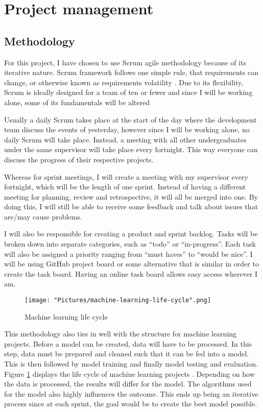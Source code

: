 \documentclass[11pt]{article}
\begin{document}
\section{Project management}
\subsection{Methodology}
For this project, I have chosen to use Scrum agile methodology because of its iterative nature. Scrum framework follows one simple rule, that requirements can change, or otherwise known as requirements volatility \cite{methodology-requirement-volatile}. Due to its flexibility, Scrum is ideally designed for a team of ten or fewer \cite{methodology-ten-fewer} and since I will be working alone, some of its fundamentals will be altered

Usually a daily Scrum takes place at the start of the day where the development team discuss the events of yesterday, however since I will be working alone, no daily Scrum will take place. Instead, a meeting with all other undergraduates under the same supervisor will take place every fortnight. This way everyone can discuss the progress of their respective projects.

Whereas for sprint meetings, I will create a meeting with my supervisor every fortnight, which will be the length of one sprint. Instead of having a different meeting for planning, review and retrospective, it will all be merged into one. By doing this, I will still be able to receive some feedback and talk about issues that are/may cause problems.

I will also be responsible for creating a product and sprint backlog. Tasks will be broken down into separate categories, such as “todo” or “in-progress”. Each task will also be assigned a priority ranging from “must haves” to “would be nice”. I will be using GitHub project board \cite{methodology-github-projects} or some alternative that is similar in order to create the task board. Having an online task board allows easy access wherever I am. 

\begin{figure}[h!]
   \texttt{[image: "Pictures/machine-learning-life-cycle".png]}
   \caption{Machine learning life cycle}
   \label{fig:ml-life-cycle}
\end{figure}

This methodology also ties in well with the structure for machine learning projects. Before a model can be created, data will have to be processed. In this step, data must be prepared and cleaned such that it can be fed into a model. This is then followed by model training and finally model testing and evaluation. Figure \ref{fig:ml-life-cycle} displays the life cycle of machine learning projects \cite{methodology-ml-life-cycle}. Depending on how the data is processed, the results will differ for the model. The algorithms used for the model also highly influences the outcome. This ends up being an iterative process since at each sprint, the goal would be to create the best model possible. 
\end{document}
